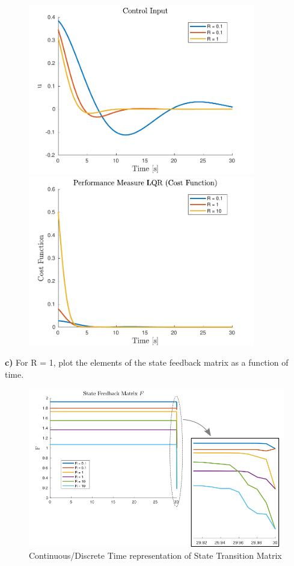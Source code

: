\documentclass{article}
\begin{document}
\begin{figure}[h]
\centering
\includegraphics [width=3.9in]{fig4.pdf}
\includegraphics [width=3.9in]{fig5.pdf}
\end{figure}


\pagebreak

\textbf{c) }For R = 1, plot the elements of the state feedback matrix as a function of time.

\begin{figure}[h]
    \centering
	\includegraphics [width=4.5in]{SFMfix.png}
	\caption{Continuous/Discrete Time representation of State Transition Matrix}
\end{figure}
\end{document}

